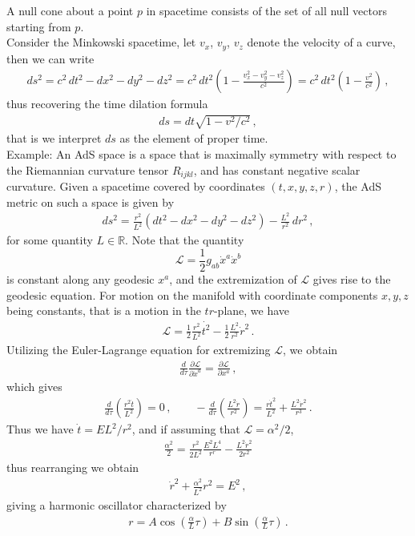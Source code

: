 \documentclass[11pt, onesided]{book}
\theoremstyle{break}
\theoremstyle{break}
\newcommand{\R}{\mathbb{R}}
\newcommand{\pd}{\partial}
\newcommand{\example}{\color{green}Example: \color{black}}
\begin{document}
A null cone about a point $p$ in spacetime consists of the set of all null vectors starting from $p$. \\


Consider the Minkowski spacetime, let $v_x$, $v_y$, $v_z$ denote the velocity of a curve, then we can write
\begin{align*}
ds^2 = c^2 \, dt^2 - dx^2 - dy^2 - dz^2 = c^2 \, dt^2 \left( 1 - \frac{v_x^2 - v_y^2 - v_z^2}{c^2}\right)  = c^2 \, dt^2 \left( 1 - \frac{v^2}{c^2}\right)\,,
\end{align*}
thus recovering the time dilation formula
\begin{align*}
ds = dt \sqrt{1 - v^2/c^2}\,,
\end{align*}
that is we interpret $ds$ as the element of proper time.\\


\example An AdS space is a space that is maximally symmetry with respect to the Riemannian curvature tensor $R_{ijkl}$, and has constant negative scalar curvature. Given a spacetime covered by coordinates $(t,x,y,z,r)$, the AdS metric on such a space is given by
\begin{align*}
ds^2 = \frac{r^2}{L^2} (dt^2 - dx^2 - dy^2 - dz^2) - \frac{L^2}{r^2}\,dr^2\,,
\end{align*}
for some quantity $L \in \R$. Note that the quantity 
$$\mathcal{L} = \frac{1}{2}g_{ab}\dot{x}^a \dot{x}^b $$
is constant along any geodesic $x^a$, and the extremization of $\mathcal{L}$ gives rise to the geodesic equation. For motion on the manifold with coordinate components $x,y,z$ being constants, that is a motion in the $tr$-plane, we have
\begin{align*}
\mathcal{L} = \frac{1}{2}\frac{r^2}{L^2} \dot{t^2}  - \frac{1}{2}\frac{L^2}{r^2}\dot{r}^2\,.
\end{align*}
Utilizing the Euler-Lagrange equation for extremizing $\mathcal{L}$, we obtain
\begin{align*}
\frac{d}{d\tau}\frac{\pd \mathcal{L}}{\pd \dot{x}^a} = \frac{\pd \mathcal{L}}{\pd x^a}\,,
\end{align*}
which gives
\begin{align*}
\frac{d}{d\tau}\left( \frac{r^2 \dot{t}}{L^2}\right) = 0\,,\qquad 
-\frac{d}{d\tau}\left( \frac{L^2 \dot{r}}{r^2}\right) = \frac{r\dot{t}^2}{L^2} + \frac{L^2 \dot{r}^2}{r^3}\,.
\end{align*}
Thus we have $\dot{t} = EL^2/r^2$, and if assuming that $\mathcal{L} = \alpha^2/2$, 
\begin{align*}
\frac{\alpha^2}{2} = \frac{r^2}{2L^2}\frac{E^2L^4}{r^r} - \frac{L^2\dot{r}^2}{2r^2}
\end{align*}
thus rearranging we obtain
\begin{align*}
\dot{r}^2 + \frac{\alpha^2}{L^2}r^2  = E^2\,,
\end{align*}
giving a harmonic oscillator characterized by
\begin{align*}
r = A\cos\left( \frac{\alpha}{L}\tau\right) + B \sin\left( \frac{\alpha}{L}\tau\right)\,.
\end{align*}
\end{document}
